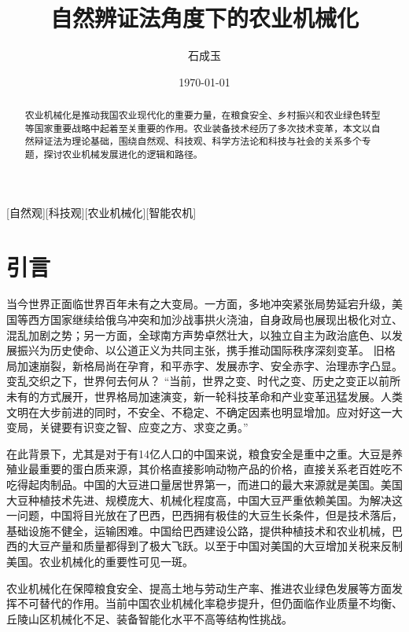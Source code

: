 \documentclass[12pt,fontset=windows,titlepage]{ctexart}
\title{自然辨证法角度下的农业机械化}
\author{石成玉}
\date{\today}
\begin{document}
	\maketitle

	\articleTitle

	\begin{abstract}
		农业机械化是推动我国农业现代化的重要力量，在粮食安全、乡村振兴和农业绿色转型等国家重要战略中起着至关重要的作用。农业装备技术经历了多次技术变革，本文以自然辩证法为理论基础，围绕自然观、科技观、科学方法论和科技与社会的关系多个专题，探讨农业机械发展进化的逻辑和路径。
	\end{abstract}

	[自然观][科技观][农业机械化][智能农机]

	\section{引言}

	当今世界正面临世界百年未有之大变局。一方面，多地冲突紧张局势延宕升级，美国等西方国家继续给俄乌冲突和加沙战事拱火浇油，自身政局也展现出极化对立、混乱加剧之势；另一方面，全球南方声势卓然壮大，以独立自主为政治底色、以发展振兴为历史使命、以公道正义为共同主张，携手推动国际秩序深刻变革。	旧格局加速崩裂，新格局尚在孕育，和平赤字、发展赤字、安全赤字、治理赤字凸显。变乱交织之下，世界何去何从？	“当前，世界之变、时代之变、历史之变正以前所未有的方式展开，世界格局加速演变，新一轮科技革命和产业变革迅猛发展。人类文明在大步前进的同时，不安全、不稳定、不确定因素也明显增加。应对好这一大变局，关键要有识变之智、应变之方、求变之勇。”\autocite{NianZhongBaoDaoShiZiLuKouDeLiShiJueZeHuiMou2024NianDeShiJieXinHuaWang}

	在此背景下，尤其是对于有14亿人口的中国来说，粮食安全是重中之重。大豆是养殖业最重要的蛋白质来源，其价格直接影响动物产品的价格，直接关系老百姓吃不吃得起肉制品。中国的大豆进口量居世界第一，而进口的最大来源就是美国。美国大豆种植技术先进、规模庞大、机械化程度高，中国大豆严重依赖美国。为解决这一问题，中国将目光放在了巴西，巴西拥有极佳的大豆生长条件，但是技术落后，基础设施不健全，运输困难。中国给巴西建设公路，提供种植技术和农业机械，巴西的大豆产量和质量都得到了极大飞跃。以至于中国对美国的大豆增加关税来反制美国\autocite{HeNanJinBaiHeShengWuJiShuFenXiangGuanShuiZhanGaiBianQuanQiuDaDouGeJuBaXiDaDouvsMeiGuoDaDouDeQuanMianDuiBi2025}。农业机械化的重要性可见一斑。

	农业机械化在保障粮食安全、提高土地与劳动生产率、推进农业绿色发展等方面发挥不可替代的作用。当前中国农业机械化率稳步提升，但仍面临作业质量不均衡、丘陵山区机械化不足、装备智能化水平不高等结构性挑战。
\end{document}

